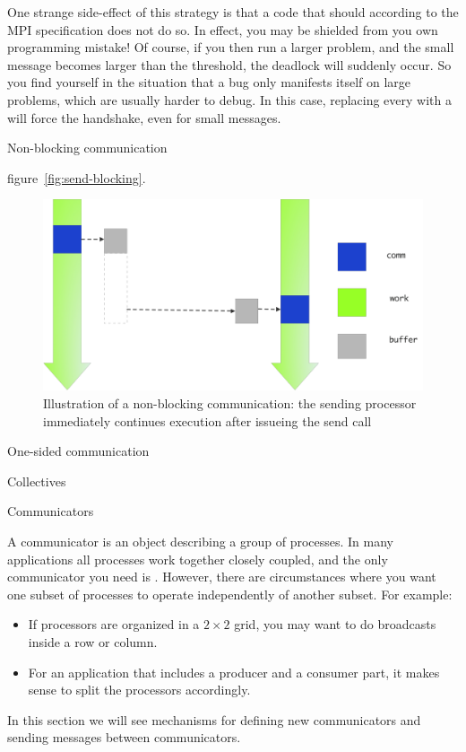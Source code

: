 One strange side-effect of this strategy is that a code that
should  according to the MPI specification does
not do so. In effect, you may be shielded from you own programming
mistake! Of course, if you then run a larger problem, and the small
message becomes larger than the threshold, the deadlock will suddenly
occur. So you find yourself in the situation that a bug only manifests
itself on large problems, which are usually harder to debug. In this
case, replacing every  with a  will force the
handshake, even for small messages.

 {Non-blocking communication}

figure~\ref{fig:send-blocking}.
\begin{figure}[ht]
\includegraphics[scale=.1]{graphics-public/send-nonblocking}
\caption{Illustration of a non-blocking communication: the sending processor immediately continues execution after issueing the send call}
\label{fig:send-nonblocking}
\end{figure}

 {One-sided communication}

 {Collectives}
\label{sec:bcast}

 {Communicators}

A communicator is an object describing a group of processes. In many 
applications all processes work together closely coupled, and the
only communicator you need is . However, there are 
circumstances where you want one subset of processes to operate 
independently of another subset. For example:
\begin{itemize}
\item If processors are organized in a $2\times2$ grid, you may want
  to do broadcasts inside a row or column. 
\item For an application that includes a producer and a consumer part,
  it makes sense to split the processors accordingly.
\end{itemize}
In this section we will see mechanisms for defining new communicators
and sending messages between communicators.

